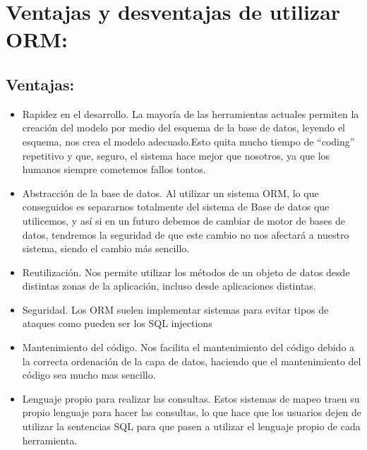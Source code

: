 \documentclass[preprint,12pt]{elsarticle}
\begin{document}
\section{Ventajas y desventajas de utilizar ORM: }

\subsection{Ventajas:}
\begin{itemize}
\item Rapidez en el desarrollo. La mayoría de las herramientas actuales permiten la creación del modelo por
medio del esquema de la base de datos, leyendo el esquema, nos crea el modelo adecuado.Esto quita
mucho tiempo de “coding” repetitivo y que, seguro, el sistema hace mejor que nosotros, ya que los
humanos siempre cometemos fallos tontos. 
\item Abstracción de la base de datos. Al utilizar un sistema ORM, lo que conseguidos es separarnos
totalmente del sistema de Base de datos que utilicemos, y así si en un futuro debemos de cambiar de
motor de bases de datos, tendremos la seguridad de que este cambio no nos afectará a nuestro
sistema, siendo el cambio más sencillo. 
\item Reutilización. Nos permite utilizar los métodos de un objeto de datos desde distintas zonas de la
aplicación, incluso desde aplicaciones distintas. 
\item Seguridad. Los ORM suelen implementar sistemas para evitar tipos de ataques como pueden ser los
SQL injections
\item Mantenimiento del código. Nos facilita el mantenimiento del código debido a la correcta ordenación de
la capa de datos, haciendo que el mantenimiento del código sea mucho mas sencillo. 
\item Lenguaje propio para realizar las consultas. Estos sistemas de mapeo traen su propio lenguaje para
hacer las consultas, lo que hace que los usuarios dejen de utilizar la sentencias SQL para que pasen a
utilizar el lenguaje propio de cada herramienta. 
\end{itemize}
\end{document}
